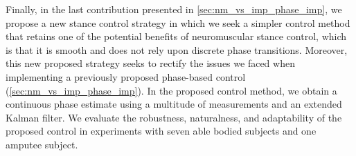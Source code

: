 Finally, in the last contribution presented in \cref{sec:nm_vs_imp_phase_imp},
we propose a new stance control strategy in which we seek a simpler control
method that retains one of the potential benefits of neuromuscular stance
control, which is that it is smooth and does not rely upon discrete phase
transitions. Moreover, this new proposed strategy seeks to rectify the issues we
faced when implementing a previously proposed phase-based control
(\cref{sec:nm_vs_imp_phase_imp}). In the proposed control method, we
obtain a continuous phase estimate using a multitude of measurements and an
extended Kalman filter. We evaluate the robustness, naturalness, and
adaptability of the proposed control in experiments with seven able bodied
subjects and one amputee subject.
